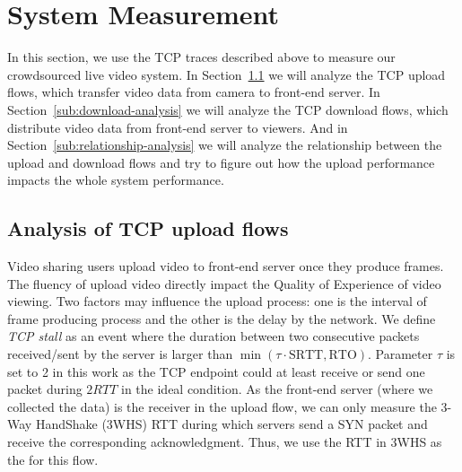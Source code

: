 
\section{System Measurement}
\label{sec:system-measurement}

In this section, we use the TCP traces described above to measure our crowdsourced live video system. In Section~\ref{sub:upload-analysis} we will analyze the TCP upload flows, which transfer video data from camera to front-end server. In Section~\ref{sub:download-analysis} we will analyze the TCP download flows, which distribute video data from front-end server to viewers. And in Section~\ref{sub:relationship-analysis} we will analyze the relationship between the upload and download flows and try to figure out how the upload performance impacts the whole system performance.

\subsection{Analysis of TCP upload flows}
\label{sub:upload-analysis}

Video sharing users upload video to front-end server once they produce frames. The fluency of upload video directly impact the Quality of Experience of video viewing. Two factors may influence the upload process: one is the interval of frame producing process and the other is the delay by the network. We define \emph{TCP stall} as an event where the duration between two consecutive packets received/sent by the server is larger than $\min(\tau\cdot\text{SRTT}, \text{RTO})$. Parameter $\tau$ is set to 2 in this work as the TCP endpoint could at least receive or send one packet during $2RTT$ in the ideal condition. As the front-end server (where we collected the data) is the receiver in the upload flow, we can only measure the 3-Way HandShake (3WHS) RTT during which servers send a SYN packet and receive the corresponding acknowledgment. Thus, we use the RTT in 3WHS as the  for this flow. 

